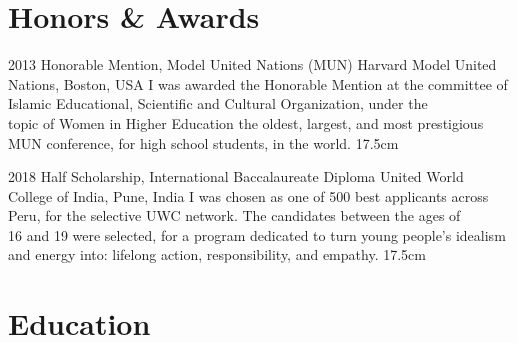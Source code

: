 \documentclass[]{friggeri-cv}
\begin{document}
\clearpage
{}



\section{Honors \& Awards}

\begin{entrylist}

  \entrywide
    {2013}
    {Honorable Mention, Model United Nations (MUN)}
    {Harvard Model United Nations, Boston, USA}
    {I was awarded the Honorable Mention at the committee of Islamic Educational, Scientific and Cultural Organization, under the\\
    topic of Women in Higher Education the oldest, largest, and most prestigious MUN conference, for high school students, in the world.}
    {17.5cm}

  \entrywide
    {2018}
    {Half Scholarship, International  Baccalaureate Diploma}
    {United World College of India, Pune, India}
    {I was chosen as one of 500 best applicants across Peru, for the selective UWC network. The candidates between the ages of\\
    16 and 19 were selected, for a program dedicated to turn young people's idealism and energy into: lifelong action, responsibility, and empathy.}
    {17.5cm}

\end{entrylist}



\section{Education}
\end{document}

